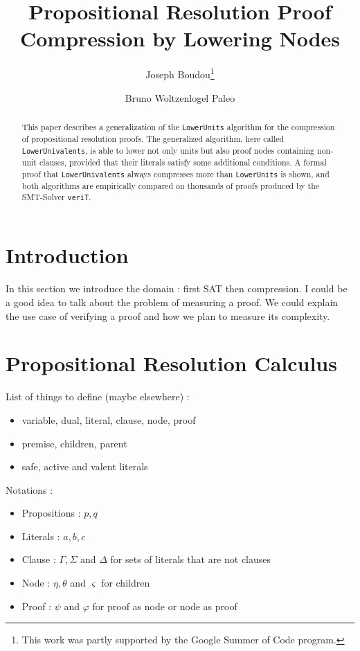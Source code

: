\documentclass{llncs}
\title{Propositional Resolution Proof Compression by Lowering Nodes}
\author{
  Joseph Boudou\inst{1}\thanks{This work was partly supported by the Google Summer of Code program.}
  \and 
  Bruno Woltzenlogel Paleo\inst{2}
}
\institute{
  Universit\'e Paul Sabatier, Toulouse \\
  \email{joseph.boudou@matabio.net}
  \and 
  Vienna University of Technology \\
  \email{bruno@logic.at}
}
\newenvironment{jogo}{\color{teal}}{}
\newcommand{\LowerUnits}{\texttt{LowerUnits}}
\newcommand{\LowerUnivalents}{\texttt{LowerUnivalents}}
\newcommand{\VeriT}{\texttt{veriT}}
\begin{document}
\maketitle


\begin{abstract}
This paper describes a generalization of the {\LowerUnits} algorithm \cite{LURPI} for the compression
of propositional resolution proofs. The generalized algorithm, here called {\LowerUnivalents}, is
able to lower not only units but also proof nodes containing non-unit clauses, provided that their
literals satisfy some additional conditions. A formal proof that {\LowerUnivalents} always
compresses more than {\LowerUnits} is shown, and both algorithms are empirically compared on
thousands of proofs produced by the SMT-Solver {\VeriT}.
\end{abstract}

\section{Introduction}

\begin{jogo}
In this section we introduce the domain : first SAT then compression.
I could be a good idea to talk about the problem of measuring a proof.
We could explain the use case of verifying a proof and how we plan to measure its complexity.
\end{jogo}

\section{Propositional Resolution Calculus}

\begin{jogo}
List of things to define (maybe elsewhere) : \begin{itemize}%
  \item variable, dual, literal, clause, node, proof
  \item premise, children, parent
  \item safe, active and valent literals
\end{itemize}

Notations : \begin{itemize}%
  \item Propositions : $p,q$
  \item Literals : $a,b,c$
  \item Clause : $\Gamma,\Sigma$ and $\Delta$ for sets of literals that are not clauses
  \item Node : $\eta,\theta$ and $\varsigma$ for children
  \item Proof : $\psi$ and $\varphi$ for proof as node or node as proof
\end{itemize}
\end{jogo}
\end{document}
